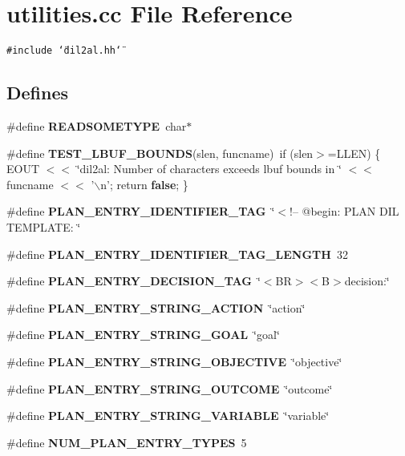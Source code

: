 \section{utilities.cc File Reference}
\label{utilities_8cc}
{\tt \#include \char`\"{}dil2al.hh\char`\"{}}\par
\subsection*{Defines}
\begin{CompactItemize}
\item 
\#define {\bf READSOMETYPE}\ char$\ast$
\item 
\#define {\bf TEST\_\-LBUF\_\-BOUNDS}(slen, funcname)\ if (slen$>$=LLEN) \{ EOUT $<$$<$ \char`\"{}dil2al: Number of characters exceeds lbuf bounds in \char`\"{} $<$$<$ funcname $<$$<$ '$\backslash$n'; return {\bf false}; \}
\item 
\#define {\bf PLAN\_\-ENTRY\_\-IDENTIFIER\_\-TAG}\ \char`\"{}$<$!-- @begin: PLAN DIL TEMPLATE: \char`\"{}
\item 
\#define {\bf PLAN\_\-ENTRY\_\-IDENTIFIER\_\-TAG\_\-LENGTH}\ 32
\item 
\#define {\bf PLAN\_\-ENTRY\_\-DECISION\_\-TAG}\ \char`\"{}$<$BR$>$$<$B$>$decision:\char`\"{}
\item 
\#define {\bf PLAN\_\-ENTRY\_\-STRING\_\-ACTION}\ \char`\"{}action\char`\"{}
\item 
\#define {\bf PLAN\_\-ENTRY\_\-STRING\_\-GOAL}\ \char`\"{}goal\char`\"{}
\item 
\#define {\bf PLAN\_\-ENTRY\_\-STRING\_\-OBJECTIVE}\ \char`\"{}objective\char`\"{}
\item 
\#define {\bf PLAN\_\-ENTRY\_\-STRING\_\-OUTCOME}\ \char`\"{}outcome\char`\"{}
\item 
\#define {\bf PLAN\_\-ENTRY\_\-STRING\_\-VARIABLE}\ \char`\"{}variable\char`\"{}
\item 
\#define {\bf NUM\_\-PLAN\_\-ENTRY\_\-TYPES}\ 5
\end{CompactItemize}
